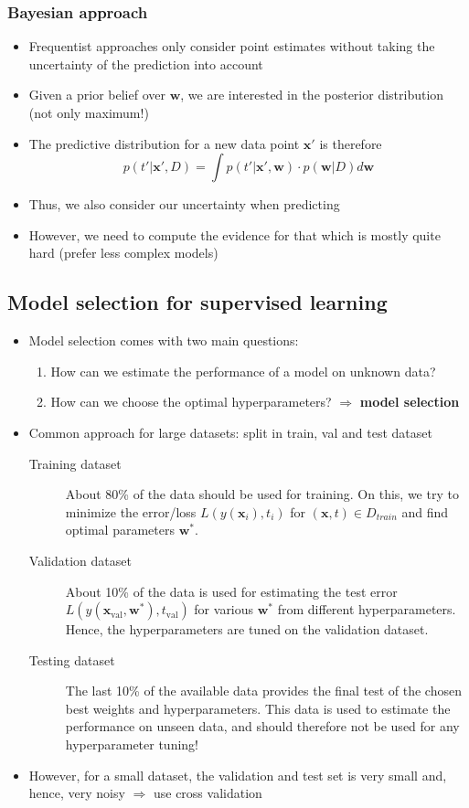 \subsubsection{Bayesian approach}
\begin{itemize}
	\item Frequentist approaches only consider point estimates without taking the uncertainty of the prediction into account
	\item Given a prior belief over $\bm{w}$, we are interested in the posterior distribution (not only maximum!)
	\item The predictive distribution for a new data point $\bm{x}'$ is therefore 
	$$p(t'|\bm{x}',D) = \int p(t'| \bm{x}', \bm{w}) \cdot p(\bm{w}|D) d\bm{w}$$
	\item Thus, we also consider our uncertainty when predicting
	\item However, we need to compute the evidence for that which is mostly quite hard (prefer less complex models)
\end{itemize}
\subsection{Model selection for supervised learning}
\begin{itemize}
	\item Model selection comes with two main questions:
	\begin{enumerate}
		\item How can we estimate the performance of a model on unknown data?
		\item How can we choose the optimal hyperparameters? $\Rightarrow$ \textbf{model selection}
	\end{enumerate}
	\item Common approach for large datasets: split in train, val and test dataset
	\begin{description}
		\item[Training dataset] About 80\% of the data should be used for training. On this, we try to minimize the error/loss $L\left(y(\bm{x}_i),t_i\right)$ for $(\bm{x},t)\in D_{train}$ and find optimal parameters $\bm{w}^*$.
		\item[Validation dataset] About 10\% of the data is used for estimating the test error $L\left(y(\bm{x}_{\text{val}}, \bm{w}^*),t_{\text{val}}\right)$ for various $\bm{w}^*$ from different hyperparameters. Hence, the hyperparameters are tuned on the validation dataset.
		\item[Testing dataset] The last 10\% of the available data provides the final test of the chosen best weights and hyperparameters. This data is used to estimate the performance on unseen data, and should therefore not be used for any hyperparameter tuning!
	\end{description}
	\item However, for a small dataset, the validation and test set is very small and, hence, very noisy $\Rightarrow$ use cross validation
\end{itemize}
